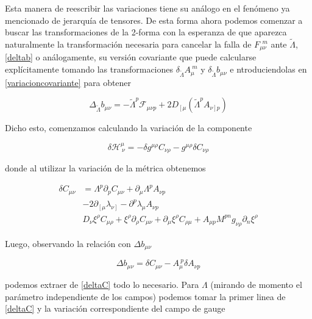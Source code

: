 \documentclass{article}
\numberwithin{equation}{section}
\begin{document}
Esta manera de reescribir las variaciones tiene su análogo en el fenómeno ya mencionado de jerarquía de tensores. De esta forma ahora podemos comenzar a buscar las transformaciones de la 2-forma con la esperanza de que aparezca naturalmente la transformación necesaria para cancelar la falla de $ F_{\mu \nu}^{\ \ m} $ ante $ \widetilde{\Lambda} $, \ref{deltab} o análogamente, su versión covariante que puede calcularse explícitamente tomando las transformaciones $ \delta_{\widetilde{\Lambda}} A_{\mu}^{\ m} $ y $\delta_{\widetilde{\Lambda}} b_{\mu \nu} $  e ntroduciendolas en \ref{variacioncovariante} para obtener

\begin{equation}\label{salvafalla}
\Delta_{\widetilde{\Lambda}}b_{\mu \nu} = -\widetilde{\Lambda}^p \mathcal{F}_{\mu \nu p} + 2 D_{\left[ \mu \right.} \left( \widetilde{\Lambda}^p A_{\left.\nu\right] p} \right)
\end{equation}


Dicho esto, comenzamos calculando la variación de la componente

\begin{equation}
\delta \mathcal{H}^{\mu}_{\ \nu} = - \delta g^{\mu \rho} C_{\nu \rho} - g^{\mu \rho} \delta C_{\nu \rho}
\end{equation}

donde al utilizar la variación de la métrica obtenemos

\begin{equation}\label{deltaC}
\begin{aligned}
\delta C_{\mu \nu} &= \Lambda^p \partial_p C_{\mu \nu} + \partial_{\mu} \Lambda^p A_{\nu p}\\
&-2 \partial_{\left[\mu \right.} \lambda_{\left. \nu \right]} - \partial^p \lambda_{\mu} A_{\nu p}\\
& D_{\nu} \xi^{\rho} C_{\mu \rho} + \xi^{\rho} \partial_{\rho} C_{\mu \nu} + \partial_{\mu} \xi^{\rho} C_{\rho \mu} + A_{\mu p}M^{p n} g_{\nu \rho} \partial_n \xi^{\rho}  
\end{aligned}
\end{equation}

Luego, observando la relación con $ \Delta b_{\mu \nu} $

\begin{equation}\label{bdeC}
\Delta b_{\mu \nu} = \delta C_{\mu \nu} - A_{\mu}^{\ p} \delta A_{\nu p}
\end{equation}

podemos extraer de \ref{deltaC} todo lo necesario. Para $ \Lambda $ (mirando de momento el parámetro independiente de los campos) podemos tomar la primer linea de \ref{deltaC} y la variación correspondiente del campo de gauge
\end{document}
